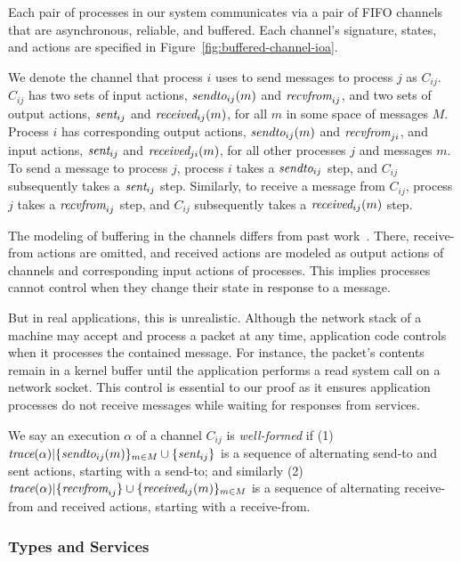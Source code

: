Each pair of processes in our system communicates via a pair of FIFO
channels that are asynchronous, reliable, and buffered. Each
channel's signature, states, and actions are specified in
Figure~\ref{fig:buffered-channel-ioa}.

We denote the channel that process $i$ uses to send messages to process $j$ as
$C_{ij}$. $C_{ij}$ has two sets of input actions, $\operatorname*{\operatorname*{\textit{sendto}}}_{ij}(m)$ and
$\operatorname*{\operatorname*{\textit{recvfrom}}}_{ij}$, and two sets of output actions, $\operatorname*{\textit{sent}}_{ij}$ and
$\operatorname*{\textit{received}}_{ij}(m)$, for all $m$ in some space of messages $M$. Process $i$ has
corresponding output actions, $\operatorname*{\operatorname*{\textit{sendto}}}_{ij}(m)$ and $\operatorname*{\operatorname*{\textit{recvfrom}}}_{ji}$, and input
actions, $\operatorname*{\textit{sent}}_{ij}$ and $\operatorname*{\textit{received}}_{ji}(m)$, for all other processes $j$ and
messages $m$. To send a message to process $j$, process $i$ takes a
$\operatorname*{\operatorname*{\textit{sendto}}}_{ij}$ step, and $C_{ij}$ subsequently takes a $\operatorname*{\textit{sent}}_{ij}$ step.
Similarly, to receive a message from $C_{ij}$, process $j$ takes a
$\operatorname*{\operatorname*{\textit{recvfrom}}}_{ij}$ step, and $C_{ij}$ subsequently takes a $\operatorname*{\textit{received}}_{ij}(m)$ step.

The modeling of buffering in the channels differs from past
work~\cite{lynch1996da}. There, receive-from actions are omitted, and received
actions are modeled as output actions of channels and corresponding input
actions of processes. This implies processes cannot control when they
change their state in response to a message.

But in real applications, this is unrealistic. Although the network stack of a
machine may accept and process a packet at any time, application code controls
when it processes the contained message. For instance, the packet's contents remain in a kernel buffer until the application performs a read system call
on a network socket. This control is essential to our proof as it ensures
application processes do not receive messages while waiting for responses from
services.

We say an execution $\alpha$ of a channel $C_{ij}$ is \textit{well-formed} if
(1) $\operatorname*{\textit{trace}}(\alpha) | \{\operatorname*{\operatorname*{\textit{sendto}}}_{ij}(m)\}_{m \in M} \cup \{\operatorname*{\textit{sent}}_{ij}\}$ is a
sequence of alternating send-to and sent actions, starting with a send-to; and
similarly (2) $\operatorname*{\textit{trace}}(\alpha) | \{\operatorname*{\operatorname*{\textit{recvfrom}}}_{ij}\} \cup \{\operatorname*{\textit{received}}_{ij}(m)\}_{m
  \in M}$ is a sequence of alternating receive-from and received actions,
starting with a receive-from.

\subsubsection{Types and Services}
\label{sec:equivalence:preliminaries:services}

